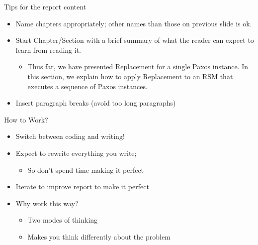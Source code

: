 \documentclass[hyperref={pdfpagelabels=false}, aspectratio=1610,handout]{beamer}
\begin{document}


\begin{frame}
\begin{block}{Tips for the report content}
 \begin{itemize}
  \item Name chapters appropriately; other names than those on previous slide is ok.
  \item Start Chapter/Section with a brief summary of what the reader can expect to learn from reading it.
  \begin{itemize}
   \item Thus far, we have presented Replacement for a single Paxos instance. In this section, we explain how to apply Replacement to an RSM that executes a sequence of Paxos instances.
  \end{itemize}
  \item Insert paragraph breaks (avoid too long paragraphs)
 \end{itemize}
\end{block}
\end{frame}

\begin{frame}
\begin{block}{How to Work?}
 \begin{itemize}
  \item<2-> Switch between coding and writing!
  \item<3-> Expect to rewrite everything you write; 
  \begin{itemize}
  	\item<3-> So don't spend time making it perfect 
  \end{itemize}
  \item<4-> Iterate to improve report to make it perfect
  \item<5-> Why work this way?
  \begin{itemize}
	\item<6-> Two modes of thinking
  	\item<6-> Makes you think differently about the problem 
  \end{itemize}
 \end{itemize}
\end{block}
\end{frame}
\end{document}
